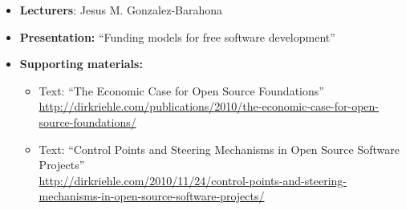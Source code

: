 \documentclass[a4paper]{article}
\begin{document}
\begin{itemize}
\item \textbf{Lecturers}: Jesus M. Gonzalez-Barahona
  
\item \textbf{Presentation:} ``Funding models for free software development''



\item \textbf{Supporting materials:} 
  \begin{itemize}
  \item Text: ``The Economic Case for Open Source Foundations''\\
    \url{http://dirkriehle.com/publications/2010/the-economic-case-for-open-source-foundations/}
  \item Text: ``Control Points and Steering Mechanisms in Open Source Software Projects''\\
    \url{http://dirkriehle.com/2010/11/24/control-points-and-steering-mechanisms-in-open-source-software-projects/} 
  \end{itemize}
\end{itemize}
\end{document}

